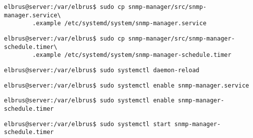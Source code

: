 	\lstset{style=commands}
	\begin{lstlisting}[caption={Kopieren des Serviceprogrammes.}]
		elbrus@server:/var/elbrus$ sudo cp snmp-manager/src/snmp-manager.service\
		.example /etc/systemd/system/snmp-manager.service
	\end{lstlisting}
	
	\lstset{style=commands}
	\begin{lstlisting}[caption={Kopieren des Zeitplanungsprogrammes.}]
		elbrus@server:/var/elbrus$ sudo cp snmp-manager/src/snmp-manager-schedule.timer\
		.example /etc/systemd/system/snmp-manager-schedule.timer
	\end{lstlisting}
	
	\lstset{style=commands}
	\begin{lstlisting}[caption={Neuladen des 'systemctl' Deamons.}]
		elbrus@server:/var/elbrus$ sudo systemctl daemon-reload
	\end{lstlisting}
	
	\lstset{style=commands}
	\begin{lstlisting}[caption={Aktivieren des Serviceprogrammes.}]
		elbrus@server:/var/elbrus$ sudo systemctl enable snmp-manager.service
	\end{lstlisting}
	
	\lstset{style=commands}
	\begin{lstlisting}[caption={Aktivieren des Zeitplanungsprogrammes.}]
		elbrus@server:/var/elbrus$ sudo systemctl enable snmp-manager-schedule.timer
	\end{lstlisting}
	
	\lstset{style=commands}
	\begin{lstlisting}[caption={Starten des Zeitplanungsprogrammes.}]
		elbrus@server:/var/elbrus$ sudo systemctl start snmp-manager-schedule.timer
	\end{lstlisting}
